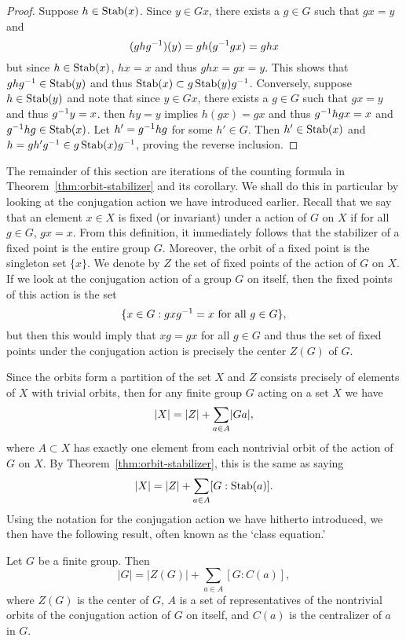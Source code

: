 \begin{proof}
    Suppose \(h \in \operatorname{Stab}(x)\). Since \(y \in Gx\), there exists a \(g \in G\)
    such that \(gx = y\) and 
    \[
        (ghg^{-1})(y) = gh(g^{-1} gx) = ghx
    \]
    but since \(h \in \operatorname{Stab}(x)\), \(hx = x\) and thus \(ghx = gx = y\). This
    shows that \(ghg^{-1} \in \operatorname{Stab}(y)\) and thus \(\operatorname{Stab}(x) \subset
    g\operatorname{Stab}(y)g^{-1}\). Conversely, suppose \(h \in \operatorname{Stab}(y)\) and note that since
    \(y \in Gx\), there exists a \(g \in G\) such that \(gx = y\) and thus
    \(g^{-1} y = x\). then \(hy = y\) implies \(h(gx) = gx\) and thus \(g^{-1} hg
    x = x\) and \(g^{-1} hg \in \operatorname{Stab}(x)\). Let \(h' = g^{-1} hg\) for some \(h'
    \in G\). Then \(h' \in \operatorname{Stab}(x)\) and \(h = gh'g^{-1} \in g\operatorname{Stab}(x)g^{-1}\),
    proving the reverse inclusion.
\end{proof}

The remainder of this section are iterations of the counting formula in
Theorem~\ref{thm:orbit-stabilizer} and its corollary. We shall do this in
particular by looking at the conjugation action we have introduced earlier.
Recall that we say that an element \(x \in X\) is fixed (or invariant) under a
action of \(G\) on \(X\) if for all \(g \in G\), \(gx = x\). From this
definition, it immediately follows that the stabilizer of a fixed point is the
entire group \(G\). Moreover, the orbit of a fixed point is the singleton set
\(\{x\}\). We denote by \(Z\) the set of fixed points of the action of \(G\) on
\(X\). If we look at the conjugation action of a group \(G\) on itself, then the
fixed points of this action is the set
\[
    \{x \in G : gxg^{-1} = x \text{ for all } g \in G\},
\]
but then this would imply that \(xg = gx\) for all \(g \in G\) and thus the set
of fixed points under the conjugation action is precisely the center \(Z(G)\) of
\(G\). 

Since the orbits form a partition of the set \(X\) and \(Z\) consists precisely
of elements of \(X\) with trivial orbits, then for any finite group \(G\) acting
on a set \(X\) we have
\[
    \lvert X \rvert = \lvert Z \rvert + \sum_{a \in A} \lvert Ga \rvert,
\]
where \(A \subset X\) has exactly one element from each nontrivial orbit of the
action of \(G\) on \(X\). By Theorem~\ref{thm:orbit-stabilizer}, this is the
same as saying
\[
    \lvert X \rvert = \lvert Z \rvert + \sum_{a \in A} [G : \operatorname{Stab}(a)].
\]
Using the notation for the conjugation action we have hitherto introduced, we
then have the following result, often known as the `class equation.'

\begin{theorem}
    Let \(G\) be a finite group. Then
    \[
        |G| = |Z(G)| + \sum_{a \in A} [G : C(a)],
    \]
    where \(Z(G)\) is the center of \(G\), \(A\) is a set of representatives of
    the nontrivial orbits of the conjugation action of \(G\) on itself, and
    \(C(a)\) is the centralizer of \(a\) in \(G\).
\end{theorem}

